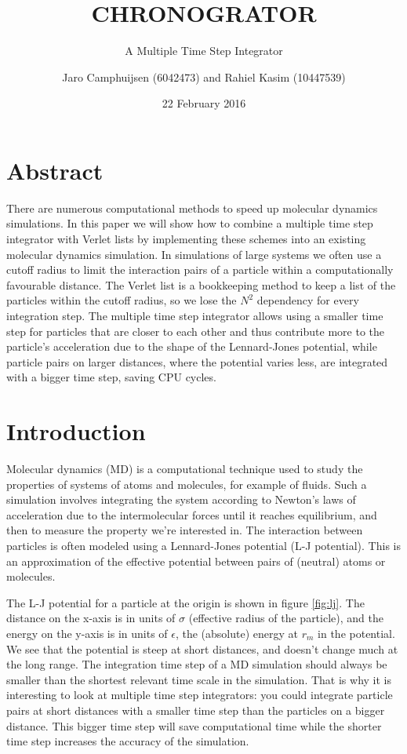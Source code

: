 \documentclass[a4paper]{article}
\author{Jaro Camphuijsen (6042473) and Rahiel Kasim (10447539)}
\date{22 February 2016}
\title{\ttfamily CHRONOGRATOR}
\subtitle{A Multiple Time Step Integrator}
\begin{document}
\maketitle

\tableofcontents

\section*{Abstract}
There are numerous computational methods to speed up molecular dynamics simulations. In this paper
we will show how to combine a multiple time step integrator with Verlet lists by implementing these
schemes into an existing molecular dynamics simulation. In simulations of large systems we often use
a cutoff radius to limit the interaction pairs of a particle within a computationally favourable
distance. The Verlet list is a bookkeeping method to keep a list of the particles within the cutoff
radius, so we lose the $N^2$ dependency for every integration step. The multiple time step
integrator allows using a smaller time step for particles that are closer to each other and thus
contribute more to the particle's acceleration due to the shape of the Lennard-Jones potential,
while particle pairs on larger distances, where the potential varies less, are integrated with a
bigger time step, saving CPU cycles.

\newpage
\section{Introduction}
Molecular dynamics (MD) is a computational technique used to study the properties of systems of
atoms and molecules, for example of fluids. Such a simulation involves integrating the system
according to Newton's laws of acceleration due to the intermolecular forces until it reaches
equilibrium, and then to measure the property we're interested in. The interaction between particles
is often modeled using a Lennard-Jones potential (L-J potential). This is an approximation of the
effective potential between pairs of (neutral) atoms or molecules. \cite{wiki:lj}

The L-J potential for a particle at the origin is shown in figure \ref{fig:lj}. The distance on the
x-axis is in units of $\sigma$ (effective radius of the particle), and the energy on the y-axis is
in units of $\epsilon$, the (absolute) energy at $r_m$ in the potential. We see that the potential
is steep at short distances, and doesn't change much at the long range. The integration time step of
a MD simulation should always be smaller than the shortest relevant time scale in the simulation.
\cite{molsim} That is why it is interesting to look at multiple time step integrators: you could
integrate particle pairs at short distances with a smaller time step than the particles on a bigger
distance. This bigger time step will save computational time while the shorter time step increases
the accuracy of the simulation.
\end{document}
